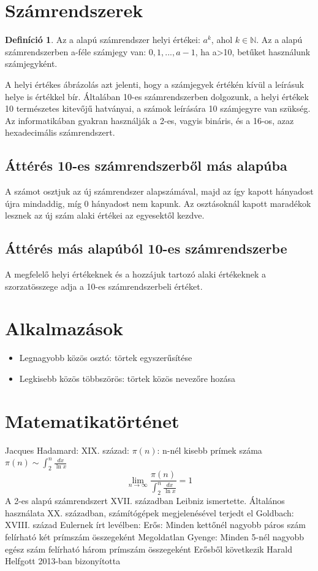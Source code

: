 \documentclass[twoside,12pt]{report}
\theoremstyle{definition}
\newtheorem{definition}[theorem]{Definíció}
\begin{document}
\section{Számrendszerek}
	\begin{definition}
		Az a alapú számrendszer helyi értékei: $a^k$, ahol $k\in\mathbb{N}$. Az a alapú számrendszerben a-féle számjegy van: $0,1,...,a-1$, ha a>10, betűket használunk számjegyként.
	\end{definition}
	A helyi értékes ábrázolás azt jelenti, hogy a számjegyek értékén kívül a leírásuk helye is értékkel bír. Általában 10-es számrendszerben dolgozunk, a helyi értékek 10 természetes kitevőjű hatványai, a számok leírására 10 számjegyre van szükség. Az informatikában gyakran használják a 2-es, vagyis bináris, és a 16-os, azaz hexadecimális számrendszert.
	\subsection{Áttérés 10-es számrendszerből más alapúba}
	A számot osztjuk az új számrendszer alapszámával, majd az így kapott hányadost újra mindaddig, míg 0 hányadost nem kapunk. Az osztásoknál kapott maradékok lesznek az új szám alaki értékei az egyesektől kezdve.
	\subsection{Áttérés más alapúból 10-es számrendszerbe}
	A megfelelő helyi értékeknek és a hozzájuk tartozó alaki értékeknek a szorzatösszege adja a 10-es számrendszerbeli értéket.
\section{Alkalmazások}
	\begin{itemize}
		\item Legnagyobb közös osztó: törtek egyszerűsítése
		\item Legkisebb közös többszörös: törtek közös nevezőre hozása
	\end{itemize}
\section{Matematikatörténet}
	\begin{outline}
		\1 Jacques Hadamard: XIX. század:
			\2 $\pi(n)$: n-nél kisebb prímek száma
			\2 $\pi(n)\sim \int_{2}^{n} \frac{dx}{\ln x}$
			\begin{equation*}
				\lim\limits_{n\to\infty} \frac{\pi(n)}{\int_{2}^{n} \frac{dx}{\ln x}}=1
			\end{equation*}
		\1 A 2-es alapú számrendszert XVII. században Leibniz ismertette.
			\2 Általános használata XX. században, számítógépek megjelenésével terjedt el
		\1 Goldbach: XVIII. század Eulernek írt levélben:
			\2 Erős: Minden kettőnél nagyobb páros szám felírható két prímszám összegeként
				\3 Megoldatlan
			\2 Gyenge: Minden 5-nél nagyobb egész szám felírható három prímszám összegeként
				\3 Erősből következik
				\3 Harald Helfgott 2013-ban bizonyította
	\end{outline}
\end{document}
